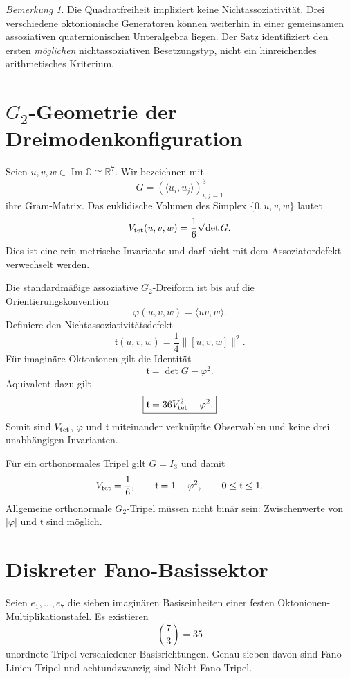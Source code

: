 \documentclass[11pt,a4paper]{article}
\theoremstyle{definition}
\theoremstyle{remark}
\newtheorem{remark}[theorem]{Bemerkung}
\newcommand{\OO}{\mathbb O}
\newcommand{\RR}{\mathbb R}
\begin{document}
\begin{remark}
Die Quadratfreiheit impliziert keine Nichtassoziativität. Drei verschiedene oktonionische Generatoren können weiterhin in einer gemeinsamen assoziativen quaternionischen Unteralgebra liegen. Der Satz identifiziert den ersten \emph{möglichen} nichtassoziativen Besetzungstyp, nicht ein hinreichendes arithmetisches Kriterium.
\end{remark}

\section{$G_2$-Geometrie der Dreimodenkonfiguration}
Seien $u,v,w\in\operatorname{Im}\OO\cong\RR^7$. Wir bezeichnen mit
\[
G=(\langle u_i,u_j\rangle)_{i,j=1}^3
\]
ihre Gram-Matrix. Das euklidische Volumen des Simplex $\{0,u,v,w\}$ lautet
\begin{equation}
V_{\rm tet}(u,v,w)=\frac16\sqrt{\det G}.
\end{equation}
Dies ist eine rein metrische Invariante und darf nicht mit dem Assoziatordefekt verwechselt werden.

Die standardmäßige assoziative $G_2$-Dreiform ist bis auf die Orientierungskonvention
\begin{equation}
\varphi(u,v,w)=\langle uv,w\rangle.
\end{equation}
Definiere den Nichtassoziativitätsdefekt
\begin{equation}
\mathfrak t(u,v,w)=\frac14\|[u,v,w]\|^2.
\end{equation}
Für imaginäre Oktonionen gilt die Identität
\begin{equation}\label{eq:g2identity}
\boxed{\mathfrak t=\det G-\varphi^2.}
\end{equation}
Äquivalent dazu gilt
\begin{equation}
\boxed{\mathfrak t=36V_{\rm tet}^2-\varphi^2.}
\end{equation}
Somit sind $V_{\rm tet}$, $\varphi$ und $\mathfrak t$ miteinander verknüpfte Observablen und keine drei unabhängigen Invarianten.

Für ein orthonormales Tripel gilt $G=I_3$ und damit
\[
V_{\rm tet}=\frac16,
\qquad
\mathfrak t=1-\varphi^2,
\qquad
0\le\mathfrak t\le1.
\]
Allgemeine orthonormale $G_2$-Tripel müssen nicht binär sein: Zwischenwerte von $|\varphi|$ und $\mathfrak t$ sind möglich.

\section{Diskreter Fano-Basissektor}
Seien $e_1,\dots,e_7$ die sieben imaginären Basiseinheiten einer festen Oktonionen-Multiplikationstafel. Es existieren
\[
\binom73=35
\]
unordnete Tripel verschiedener Basisrichtungen. Genau sieben davon sind Fano-Linien-Tripel und achtundzwanzig sind Nicht-Fano-Tripel.
\end{document}
